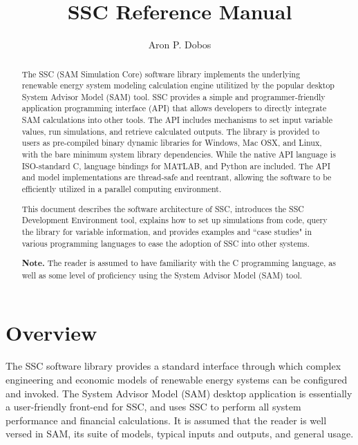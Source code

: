 \documentclass{article}
\title{SSC Reference Manual}
\author{Aron P. Dobos}
\begin{document}
\maketitle
\vspace{3in}
\begin{abstract}
The SSC (SAM Simulation Core) software library implements the underlying renewable energy system modeling calculation engine utilitized by the popular desktop System Advisor Model (SAM) tool.  SSC provides a simple and programmer-friendly application programming interface (API) that allows developers to directly integrate SAM calculations into other tools.  The API includes mechanisms to set input variable values, run simulations, and retrieve calculated outputs.  The library is provided to users as pre-compiled binary dynamic libraries for Windows, Mac OSX, and Linux, with the bare minimum system library dependencies.  While the native API language is ISO-standard C, language bindings for MATLAB, and Python are included.  The API and model implementations are thread-safe and reentrant, allowing the software to be efficiently utilized in a parallel computing environment.

This document describes the software architecture of SSC, introduces the SSC Development Environment tool, explains how to set up simulations from code, query the library for variable information, and provides examples and ``case studies" in various programming languages to ease the adoption of SSC into other systems.  

\textbf{Note.} The reader is assumed to have familiarity with the C programming language, as well as some level of proficiency using the System Advisor Model (SAM) tool.
\end{abstract} 

\newpage
\tableofcontents
\newpage

\section{Overview}
\label{sec_overview}

The SSC software library provides a standard interface through which complex engineering and economic models of renewable energy systems can be configured and invoked.  The System Advisor Model (SAM) desktop application is essentially a user-friendly front-end for SSC, and uses SSC to perform all system performance and financial calculations.  It is assumed that the reader is well versed in SAM, its suite of models, typical inputs and outputs, and general usage.
\end{document}
